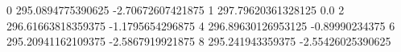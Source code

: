 0 295.0894775390625 -2.70672607421875
1 297.79620361328125 0.0
2 296.61663818359375 -1.1795654296875
4 296.89630126953125 -0.89990234375
6 295.20941162109375 -2.5867919921875
8 295.241943359375 -2.55426025390625
